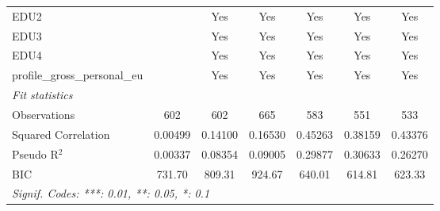 \begin{tabular}{lcccccc}
   EDU2                                      &          & Yes           & Yes          & Yes      & Yes      & Yes\\  
   EDU3                                      &          & Yes           & Yes          & Yes      & Yes      & Yes\\  
   EDU4                                      &          & Yes           & Yes          & Yes      & Yes      & Yes\\  
   profile\_gross\_personal\_eu              &          & Yes           & Yes          & Yes      & Yes      & Yes\\  
   \midrule
   \emph{Fit statistics}\\
   Observations                              & 602      & 602           & 665          & 583      & 551      & 533\\  
   Squared Correlation                       & 0.00499  & 0.14100       & 0.16530      & 0.45263  & 0.38159  & 0.43376\\  
   Pseudo R$^2$                              & 0.00337  & 0.08354       & 0.09005      & 0.29877  & 0.30633  & 0.26270\\  
   BIC                                       & 731.70   & 809.31        & 924.67       & 640.01   & 614.81   & 623.33\\  
   \midrule \midrule
   \multicolumn{7}{l}{\emph{Signif. Codes: ***: 0.01, **: 0.05, *: 0.1}}\\
\end{tabular}
\par\endgroup


